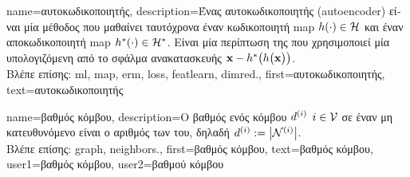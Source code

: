 {name={\foreignlanguage{greek}{αυτοκωδικοποιητής}},
	description={\foreignlanguage{greek}{Ένας αυτοκωδικοποιητής} (autoencoder) 
		\foreignlanguage{greek}{είναι μία μέθοδος}  \foreignlanguage{greek}{που μαθαίνει ταυτόχρονα 
		έναν κωδικοποιητή} \gls{map} $h(\cdot) \in \mathcal{H}$ \foreignlanguage{greek}{και έναν αποκωδικοποιητή} \gls{map} 
		$h^{*}(\cdot) \in \mathcal{H}^{*}$. \foreignlanguage{greek}{Είναι μία περίπτωση της} 
		 \foreignlanguage{greek}{που χρησιμοποιεί μία}  \foreignlanguage{greek}{υπολογιζόμενη από το 
		σφάλμα ανακατασκευής} ${\bf x} - h^{*}\big(  h \big( {\bf x} \big) \big)$.\\
		\foreignlanguage{greek}{Βλέπε επίσης:} \gls{ml}, \gls{map}, \gls{erm}, \gls{loss}, \gls{featlearn}, \gls{dimred}.},
	first={\foreignlanguage{greek}{αυτοκωδικοποιητής}},
	text={\foreignlanguage{greek}{αυτοκωδικοποιητής}}
}

{name={\foreignlanguage{greek}{βαθμός κόμβου}},
	description={\foreignlanguage{greek}{Ο βαθμός ενός κόμβου} 
		$d^{(i)}$ $i \in \mathcal{V}$ \foreignlanguage{greek}{σε έναν μη κατευ\-θυ\-νόμενο} 
		 \foreignlanguage{greek}{είναι ο αριθμός των}   
		\foreignlanguage{greek}{του, δηλαδή} $d^{(i)} := \big|\mathcal{N}^{(i)}\big|$.\\
		\foreignlanguage{greek}{Βλέπε επίσης:} \gls{graph}, \gls{neighbors}.},
	first={\foreignlanguage{greek}{βαθμός κόμβου}},
	text={\foreignlanguage{greek}{βαθμός κόμβου}},
	user1={\foreignlanguage{greek}{βαθμός κόμβου}}, %
  	user2={\foreignlanguage{greek}{βαθμού κόμβου}} %
}

